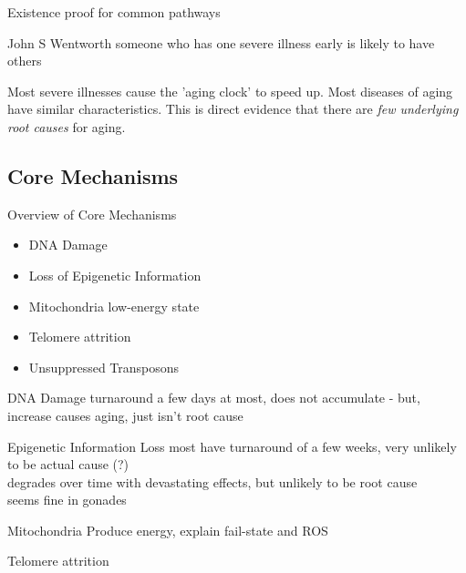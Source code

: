\begin{frame}[c]{Existence proof for common pathways}
    \large
    \begin{aquote}{John S Wentworth}
        someone who has one severe illness early is likely to have others
    \end{aquote}

    \pause
    Most severe illnesses cause the 'aging clock' to speed up. Most diseases of
    aging have similar characteristics. This is direct evidence that there are
    {\em few underlying root causes} for aging.
\end{frame}


\subsection{Core Mechanisms}

\begin{frame}[c]{Overview of Core Mechanisms}
    \large
    \begin{itemize}[<+(1)->]
        \item DNA Damage
        \item Loss of Epigenetic Information
        \item Mitochondria low-energy state
        \item Telomere attrition
        \item Unsuppressed Transposons
    \end{itemize}
\end{frame}

\begin{frame}[c]{DNA Damage}
    turnaround a few days at most, does not accumulate - but, increase causes aging, just isn't root cause
\end{frame}

\begin{frame}[c]{Epigenetic Information Loss}
    most have turnaround of a few weeks, very unlikely to be actual cause (?) \\
    degrades over time with devastating effects, but unlikely to be root cause \\
    seems fine in gonades \\
\end{frame}


\begin{frame}[c]{Mitochondria}
    Produce energy, explain fail-state and ROS
\end{frame}

\begin{frame}[c]{Telomere attrition}

\end{frame}

